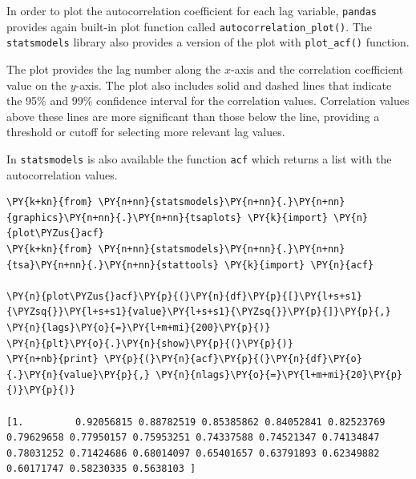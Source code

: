 In order to plot the autocorrelation coefficient for each lag variable,
\texttt{pandas} provides again built-in plot function called
\texttt{autocorrelation\_plot()}.
The \texttt{statsmodels} library also provides a version of the plot with
\texttt{plot\_acf()} function.

The plot provides the lag number along the \(x\)-axis and the
correlation coefficient value on the \(y\)-axis. The
plot also includes solid and dashed lines that indicate the 95\% and
99\% confidence interval for the correlation values. Correlation values
above these lines are more significant than those below the line,
providing a threshold or cutoff for selecting more relevant lag values.

In \texttt{statsmodels} is also available the function \texttt{acf} which 
returns a list with the autocorrelation values.
%
%

\begin{codebox}[breakable, size=fbox, boxrule=1pt, pad at break*=1mm,colback=cellbackground, colframe=cellborder]
\begin{Verbatim}[commandchars=\\\{\}]
\PY{k+kn}{from} \PY{n+nn}{statsmodels}\PY{n+nn}{.}\PY{n+nn}{graphics}\PY{n+nn}{.}\PY{n+nn}{tsaplots} \PY{k}{import} \PY{n}{plot\PYZus{}acf}
\PY{k+kn}{from} \PY{n+nn}{statsmodels}\PY{n+nn}{.}\PY{n+nn}{tsa}\PY{n+nn}{.}\PY{n+nn}{stattools} \PY{k}{import} \PY{n}{acf}

\PY{n}{plot\PYZus{}acf}\PY{p}{(}\PY{n}{df}\PY{p}{[}\PY{l+s+s1}{\PYZsq{}}\PY{l+s+s1}{value}\PY{l+s+s1}{\PYZsq{}}\PY{p}{]}\PY{p}{,} \PY{n}{lags}\PY{o}{=}\PY{l+m+mi}{200}\PY{p}{)}
\PY{n}{plt}\PY{o}{.}\PY{n}{show}\PY{p}{(}\PY{p}{)}
\PY{n+nb}{print} \PY{p}{(}\PY{n}{acf}\PY{p}{(}\PY{n}{df}\PY{o}{.}\PY{n}{value}\PY{p}{,} \PY{n}{nlags}\PY{o}{=}\PY{l+m+mi}{20}\PY{p}{)}\PY{p}{)}

[1.         0.92056815 0.88782519 0.85385862 0.84052841 0.82523769
0.79629658 0.77950157 0.75953251 0.74337588 0.74521347 0.74134847
0.78031252 0.71424686 0.68014097 0.65401657 0.63791893 0.62349882
0.60171747 0.58230335 0.5638103 ]
\end{Verbatim}
\end{codebox}
    

